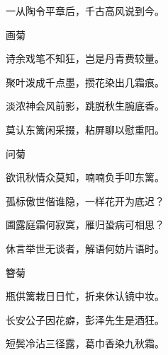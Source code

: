 \begin{poem}
    \begin{pl}一从陶令平章后，千古高风说到今。\end{pl}
    \emptypl

    \begin{pl}画菊　\end{pl}

    \begin{pl}诗余戏笔不知狂，岂是丹青费较量。\end{pl}

    \begin{pl}聚叶泼成千点墨，攒花染出几霜痕。\end{pl}

    \begin{pl}淡浓神会风前影，跳脱秋生腕底香。\end{pl}

    \begin{pl}莫认东篱闲采掇，粘屏聊以慰重阳。\end{pl}
    \emptypl

    \begin{pl}问菊　\end{pl}

    \begin{pl}欲讯秋情众莫知，喃喃负手叩东篱。\end{pl}

    \begin{pl}孤标傲世偕谁隐，一样花开为底迟？\end{pl}

    \begin{pl}圃露庭霜何寂寞，雁归蛩病可相思？\end{pl}

    \begin{pl}休言举世无谈者，解语何妨片语时。\end{pl}
    \emptypl

    \begin{pl}簪菊　\end{pl}

    \begin{pl}瓶供篱栽日日忙，折来休认镜中妆。\end{pl}

    \begin{pl}长安公子因花癖，彭泽先生是酒狂。\end{pl}

    \begin{pl}短鬓冷沾三径露，葛巾香染九秋霜。\end{pl}


\end{poem}

